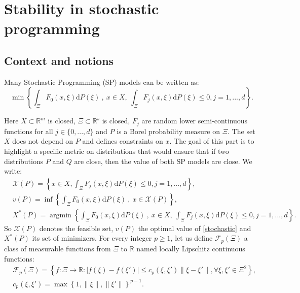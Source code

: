 \documentclass{amsart}
\newcommand{\argmin}{\mathop{\arg\min}}
\newcommand{\RR}{\mathbb{R}}
\begin{document}
\section{Stability in stochastic programming}\label{stability}
\subsection{Context and notions}
Many Stochastic Programming (SP) models can be written as:
\begin{equation}\label{stochastic}
\min\left\{\int_\Xi F_0\left(x,\xi\right)\text{d}P\left(\xi\right)\:,\: x\in X, \: \int_\Xi F_j\left(x,\xi\right)\text{d}P\left(\xi\right)\leq0, j=1,...,d\right\}.
\end{equation}

Here $X\subset\RR^m$ is closed, $\Xi\subset\RR^s$ is closed, $F_j$ are random lower semi-continuous functions for all $j\in\{0,...,d\}$ and $P$ is a Borel probability measure on $\Xi$. The set $X$ does not depend on $P$ and defines constraints on $x$. The goal of this part is to highlight a specific metric on distributions that would ensure that if two distributions $P$ and $Q$ are close, then the value of both SP models are close. We write:
\begin{align*}
    &\mathcal{X}\left(P\right)=\left\{x\in X, \int_\Xi F_j\left(x,\xi\right)\text{d}P\left(\xi\right)\leq0, j=1,...,d\right\},\\
    &v\left(P\right)=\inf\left\{\int_\Xi F_0\left(x,\xi\right)\text{d}P\left(\xi\right)\:,\: x\in \mathcal{X}\left(P\right)\right\}, \\
    &X^*\left(P\right)=\argmin\left\{\int_\Xi F_0\left(x,\xi\right)\text{d}P\left(\xi\right)\:,\: x\in X, \: \int_\Xi F_j\left(x,\xi\right)\text{d}P\left(\xi\right)\leq0, j=1,...,d\right\}.
\end{align*}
So $\mathcal{X}\left(P\right)$ denotes the feasible set, $v\left(P\right)$ the optimal value of \eqref{stochastic} and $X^*\left(P\right)$ its set of minimizers. For every integer $p\geq 1$, let us define $\mathcal{F}_p\left(\Xi\right)$ a class of measurable functions from $\Xi$ to $\RR$ named locally Lipschitz continuous functions:
\begin{align*}
    &\mathcal{F}_p\left(\Xi\right)=\left\{f:\Xi\to \RR: \lvert f\left(\xi\right)-f\left(\xi'\right)\rvert \leq c_p\left(\xi,\xi'\right)\lVert\xi-\xi'\rVert, \forall \xi,\xi'\in \Xi^2 \right\}, \\
   & c_p\left(\xi,\xi'\right)=\max \left\{1,\lVert\xi \rVert,\lVert\xi'\rVert\right\}^{p-1}.
\end{align*}
\end{document}
